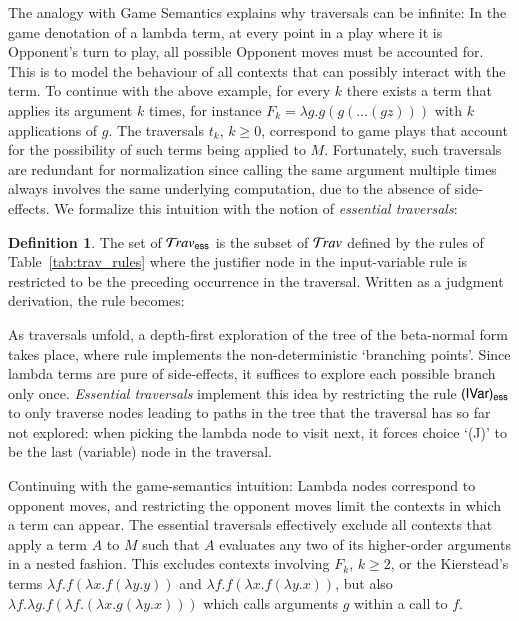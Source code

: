 \documentclass{elsarticle}
\theoremstyle{plain}
\theoremstyle{definition}
\newtheorem{definition}{Definition}[section]
\newcommand\Nodes{\mathcal{N}}%
\newcommand\ExtendedNodesVar{\tilde{\Nodes}_{\sf var}}
\newcommand\ExtendedNodesLmd{\tilde{\Nodes}_{\lambda}}
\newcommand{\essential}{{\sf ess}}
\newcommand{\travsetes}{{\travset_\essential}} %
\newcommand{\travulc}{\travset}
\newcommand{\rulefont}[1]{\mathbf{\sf #1}}
\newcommand{\enables}{\vdash} %
\newcommand{\ExternalNodes}{\Nodes^{\sf ext}}
\def\istraversal{\models}
\begin{document}
The analogy with Game Semantics explains why traversals can be infinite: In the game denotation of a lambda term, at every point in a play where it is Opponent's turn to play, all possible Opponent moves must be accounted for.
This is to model the behaviour of all contexts that can possibly interact with the term. To continue with the above example, for every $k$ there exists a term that applies its argument $k$ times, for instance $F_k = \lambda g . g (g ( \ldots (g z)))$ with $k$ applications of $g$.
The traversals $t_k$, $k\geq 0$, correspond to game plays
 that account for the possibility of
 such terms being applied to $M$. Fortunately, such traversals are redundant for normalization since calling the same argument multiple times always involves the same underlying computation, due to the absence of side-effects. We formalize this intuition with the notion of \emph{essential traversals}:

\begin{definition}
\label{def:essential_traversals}
The set of  $\travsetes$ is the subset of $\travulc$ defined by the rules of Table~\ref{tab:trav_rules} where the justifier node in the input-variable rule  is restricted to be the preceding occurrence in the traversal. Written as a judgment derivation, the rule becomes:
\infrule[$\rulefont{IVar_\essential}$]
     {\istraversal t \cdot n
      \andalso n \in\ExternalNodes\inter\ExtendedNodesVar
      \andalso \nu \in\ExtendedNodesLmd
      \andalso n \enables_i\nu
      \andalso i \geq 1
     }
     {\istraversal  {}}
\end{definition}

As traversals unfold, a depth-first exploration of the tree of the beta-normal form takes place, where rule  implements the non-deterministic `branching points'. Since lambda terms are pure of side-effects,
it suffices to explore each possible branch only once.
\emph{Essential traversals} implement this idea by restricting the rule $\rulenamet{IVar}_\essential$ to only traverse nodes leading to paths in the tree that the traversal has so far not explored: when picking the lambda node to visit next, it forces choice `(J)' to be the last (variable) node in the traversal.

Continuing with the game-semantics intuition: Lambda nodes correspond to opponent moves, and restricting the opponent moves limit the contexts in which a term can appear.
The essential traversals effectively exclude all contexts that apply a term $A$ to $M$ such that $A$ evaluates any two of its higher-order arguments in a nested fashion. This excludes contexts involving $F_k$, $k\geq 2$, or the Kierstead's terms $\lambda f .f (\lambda x .f (\lambda y.y))$ and $\lambda f .f (\lambda x .f (\lambda y.x))$, but also $\lambda f. \lambda g . f (\lambda f .(\lambda x . g (\lambda y . x)))$ which calls arguments $g$ within a call to  $f$.
\end{document}
